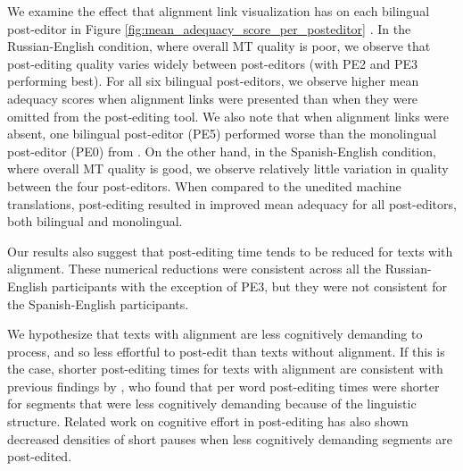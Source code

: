 %
%
%


We examine the effect that alignment link visualization has on each bilingual post-editor in Figure \ref{fig:mean_adequacy_score_per_posteditor} .
%
In the Russian-English condition, where overall MT quality is poor, we observe that post-editing quality varies widely between post-editors (with PE2 and PE3 performing best).
%
For all six bilingual post-editors, we observe higher mean adequacy scores when alignment links were presented than when they were omitted from the post-editing tool.
%
We also note that when alignment links were absent, one bilingual post-editor (PE5) performed worse than the monolingual post-editor (PE0) from \citet{2014_WMT_Schwartz_etal}.
%
On the other hand, in the Spanish-English condition, where overall MT quality is good, we observe relatively little variation in quality between the four post-editors.
%
When compared to the unedited machine translations, post-editing resulted in improved mean adequacy for all post-editors, both bilingual and monolingual.

Our results also suggest that post-editing time tends to be reduced for texts with alignment. 
%
These numerical reductions were consistent across all the Russian-English participants with the exception of PE3, but they were not consistent for the Spanish-English participants. 

We hypothesize that texts with alignment are less cognitively demanding to process, and so less effortful to post-edit than texts without alignment. 
%
If this is the case, shorter post-editing times for texts with alignment are consistent with previous findings by \citet{2012_AMTA_Koponen_etal}, who found that per word post-editing times were shorter for segments that were less cognitively demanding because of the linguistic structure. 
%
Related work on cognitive effort in post-editing \citep{2014_AMTA_Lacruz_etal,2014_Lacruz_Shreve} has also shown decreased densities of short pauses when less cognitively demanding segments are post-edited. 



